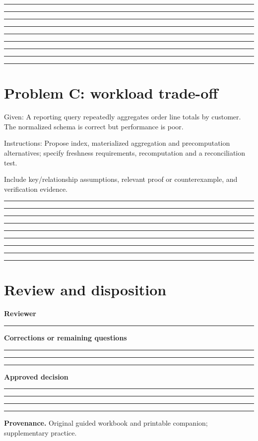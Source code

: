 \documentclass[11pt,letterpaper]{article}
\newcommand{\ResponseLine}{\par\vspace{1.05em}\noindent\rule{\linewidth}{0.4pt}\par}
\newcommand{\ResponseArea}{\ResponseLine\ResponseLine\ResponseLine}
\begin{document}
\ResponseArea\ResponseArea\ResponseArea
\section{Problem C: workload trade-off}
Given: A reporting query repeatedly aggregates order line totals by customer. The normalized schema is correct but performance is poor.


Instructions: Propose index, materialized aggregation and precomputation alternatives; specify freshness requirements, recomputation and a reconciliation test.

Include key/relationship assumptions, relevant proof or counterexample, and verification evidence.

\ResponseArea\ResponseArea\ResponseArea
\section{Review and disposition}
\textbf{Reviewer}\ResponseLine\textbf{Corrections or remaining questions}\ResponseArea\textbf{Approved decision}\ResponseArea
\vfill
\hrule
{\footnotesize\textbf{Provenance.} Original guided workbook and printable companion; supplementary practice.}
\end{document}
